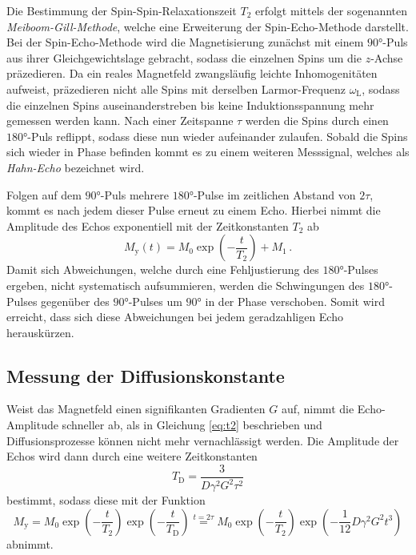Die Bestimmung der Spin-Spin-Relaxationszeit $T_2$ erfolgt mittels der sogenannten \textit{Meiboom-Gill-Methode}, welche eine Erweiterung der Spin-Echo-Methode darstellt.
Bei der Spin-Echo-Methode wird die Magnetisierung zunächst mit einem $90°$-Puls aus ihrer Gleichgewichtslage gebracht, sodass die einzelnen Spins um die $z$-Achse präzedieren.
Da ein reales Magnetfeld zwangsläufig leichte Inhomogenitäten aufweist, präzedieren nicht alle Spins mit derselben Larmor-Frequenz $\omega_\text{L}$, sodass die einzelnen Spins auseinanderstreben bis keine Induktionsspannung mehr gemessen werden kann.
Nach einer Zeitspanne $\tau$ werden die Spins durch einen $180°$-Puls reflippt, sodass diese nun wieder aufeinander zulaufen.
Sobald die Spins sich wieder in Phase befinden kommt es zu einem weiteren Messsignal, welches als \textit{Hahn-Echo} bezeichnet wird.

Folgen auf dem $90°$-Puls mehrere $180°$-Pulse im zeitlichen Abstand von $2\tau$, kommt es nach jedem dieser Pulse erneut zu einem Echo.
Hierbei nimmt die Amplitude des Echos exponentiell mit der Zeitkonstanten $T_2$ ab
\begin{equation}
    M_\text{y}(t)=M_0\exp(-\frac{t}{T_2}) + M_1\, . \label{eq:t2}
\end{equation}
Damit sich Abweichungen, welche durch eine Fehljustierung des $180°$-Pulses ergeben, nicht systematisch aufsummieren, werden die Schwingungen des $180°$-Pulses gegenüber des $90°$-Pulses um $90°$ in der Phase verschoben.
Somit wird erreicht, dass sich diese Abweichungen bei jedem geradzahligen Echo herauskürzen.

\subsection{Messung der Diffusionskonstante}
Weist das Magnetfeld einen signifikanten Gradienten $G$ auf, nimmt die Echo-Amplitude schneller ab, als in Gleichung \eqref{eq:t2} beschrieben und Diffusionsprozesse können nicht mehr vernachlässigt werden.
Die Amplitude der Echos wird dann durch eine weitere Zeitkonstanten
\begin{equation}
    T_\text{D}=\frac{3}{D\gamma^2 G^2\tau^2} 
\end{equation}
bestimmt, sodass diese mit der Funktion
\begin{equation}
    M_\text{y}=M_0\exp(-\frac{t}{T_2})\exp(-\frac{t}{T_\text{D}}) \stackrel{t=2\tau}{=} M_0\exp(-\frac{t}{T_2})\exp(-\frac{1}{12}D\gamma^2 G^2 t^3)
    \label{eq:echo}
\end{equation}
abnimmt.




